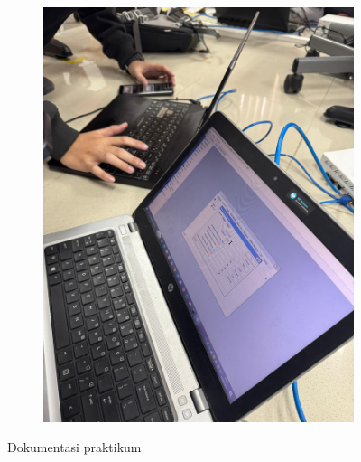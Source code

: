 \begin{figure}[H]
\begin{subfigure}[b]{0.4\linewidth}
		\includegraphics[width=\linewidth]{P2/img/dokum (7).jpg}
	\end{subfigure}
	\caption{Dokumentasi praktikum}
\end{figure}